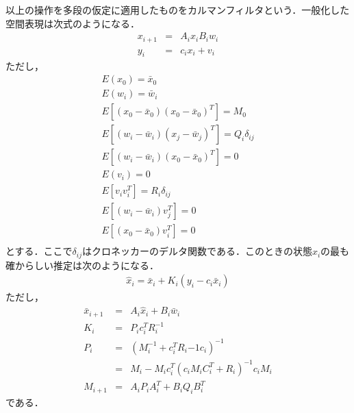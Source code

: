 \documentclass[a4paper,12pt]{jarticle}
\begin{document}
以上の操作を多段の仮定に適用したものをカルマンフィルタという．一般化した空間表現は次式のようになる．
%
\begin{eqnarray}
 x_{i+1} & = & A_ix_i B_iw_i \\
 \label{(14)}
 y_i & = & c_ix_i + v_i
 \label{(15)}
\end{eqnarray}
%
ただし，
%
\begin{eqnarray}
 E(x_0) = \bar{x}_0 \\
 E(w_i) = \bar{w}_i \\
 E[(x_0 - \bar{x}_0)(x_0 - \bar{x}_0)^T] = M_0 \\
 E[(w_i - \bar{w}_i)(x_j - \bar{w}_j)^T] = Q_i \delta_{ij} \\
 E[(w_i - \bar{w}_i)(x_0 - \bar{x}_0)^T] = 0 \\
 E(v_i) = 0 \\
 E[v_iv_i^T] = R_i \delta_{ij} \\
 E[(w_i - \bar{w}_i) v_j^T] = 0 \\
 E[(x_0 - \bar{x}_0) v_i^T] = 0 \\
\end{eqnarray}
%
とする．ここで$ \delta_{ij} $はクロネッカーのデルタ関数である．このときの状態$ x_i $の最も確からしい推定は次のようになる．
%
\begin{eqnarray}
 \hat{x}_i = \bar{x}_i + K_i(y_i -c_i\bar{x}_i)
\label{(26)}
\end{eqnarray}
%
ただし，
%
\begin{eqnarray}
 \bar{x}_{i+1} &=& A_i \hat{x}_i + B_i \bar{w}_i \\
 K_i &=& P_i c_i^T R_i^{-1} \\
 P_i &=& ( M_i^{-1} + c_i^T R_i{-1} c_i)^{-1} \nonumber \\
    & = & M_i - M_ic_i^T (c_iM_iC_i^T + R_i)^{-1}c_iM_i \\
 M_{i+1} &=& A_iP_iA_i^T + B_iQ_iB_i^T
\end{eqnarray}
%
である．
\end{document}
